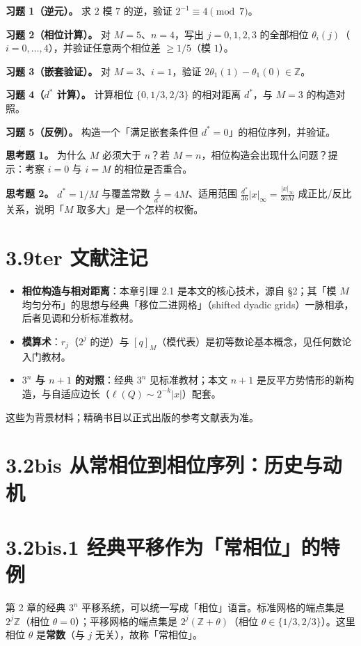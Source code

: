 \documentclass[a4paper,11pt,openany]{ctexbook}
\numberwithin{equation}{chapter}
\numberwithin{figure}{chapter}
\numberwithin{table}{chapter}
\begin{document}
\textbf{习题 1（逆元）。} 求 $2$ 模 $7$ 的逆，验证 $2^{-1}\equiv4\pmod7$。

\textbf{习题 2（相位计算）。} 对 $M=5$、$n=4$，写出 $j=0,1,2,3$ 的全部相位 $\theta_i(j)$（$i=0,\dots,4$），并验证任意两个相位差 $\ge1/5$（模 $1$）。

\textbf{习题 3（嵌套验证）。} 对 $M=3$、$i=1$，验证 $2\theta_1(1)-\theta_1(0)\in\mathbb Z$。

\textbf{习题 4（$d^*$ 计算）。} 计算相位 $\{0,1/3,2/3\}$ 的相对距离 $d^*$，与 $M=3$ 的构造对照。

\textbf{习题 5（反例）。} 构造一个「满足嵌套条件但 $d^*=0$」的相位序列，并验证。

\textbf{思考题 1。} 为什么 $M$ 必须大于 $n$？若 $M=n$，相位构造会出现什么问题？提示：考察 $i=0$ 与 $i=M$ 的相位是否重合。

\textbf{思考题 2。} $d^*=1/M$ 与覆盖常数 $\frac4{d^*}=4M$、适用范围 $\frac{d^*}{36}|x|_\infty=\frac{|x|_\infty}{36M}$ 成正比/反比关系，说明「$M$ 取多大」是一个怎样的权衡。

\section{3.9ter 文献注记}

\begin{itemize}
\item \textbf{相位构造与相对距离}：本章引理 2.1 是本文的核心技术，源自 §2；其「模 $M$ 均匀分布」的思想与经典「移位二进网格」（shifted dyadic grids）一脉相承，后者见调和分析标准教材。
\item \textbf{模算术}：$r_j$（$2^j$ 的逆）与 $[q]_M$（模代表）是初等数论基本概念，见任何数论入门教材。
\item \textbf{$3^n$ 与 $n+1$ 的对照}：经典 $3^n$ 见标准教材；本文 $n+1$ 是反平方势情形的新构造，与自适应边长（$\ell(Q)\sim2^{-k}|x|$）配套。
\end{itemize}

这些为背景材料；精确书目以正式出版的参考文献表为准。

\section{3.2bis 从常相位到相位序列：历史与动机}

\section{3.2bis.1 经典平移作为「常相位」的特例}

第 2 章的经典 $3^n$ 平移系统，可以统一写成「相位」语言。标准网格的端点集是 $2^j\mathbb Z$（相位 $\theta=0$）；平移网格的端点集是 $2^j(\mathbb Z+\theta)$（相位 $\theta\in\{1/3,2/3\}$）。这里相位 $\theta$ 是\textbf{常数}（与 $j$ 无关），故称「常相位」。
\end{document}
